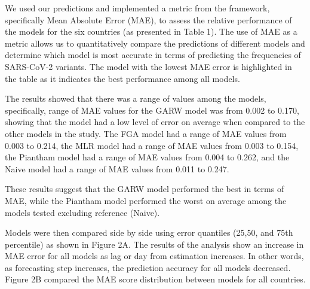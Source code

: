 \documentclass[11pt,oneside,letterpaper]{article}
\begin{document}
We used our predictions and implemented a metric from the framework, specifically Mean Absolute Error (MAE), to assess the relative performance of the models for the six countries (as presented in Table 1). %
The use of MAE as a metric allows us to quantitatively compare the predictions of different models and determine which model is most accurate in terms of predicting the frequencies of SARS-CoV-2 variants.
The model with the lowest MAE error is highlighted in the table as it indicates the best performance among all models. 

The results showed that there was a range of values among the models, specifically, range of MAE values for the GARW model was from 0.002 to 0.170, showing that the model had a low level of error on average when compared to the other models in the study. 
The FGA model had a range of MAE values from 0.003 to 0.214, the MLR model had a range of MAE values from 0.003 to 0.154, the Piantham model had a range of MAE values from 0.004 to 0.262, and the Naive model had a range of MAE values from 0.011 to 0.247. 

These results suggest that the GARW model performed the best in terms of MAE, while the Piantham model performed the worst on average among the models tested excluding reference (Naive).

Models were then compared side by side using error quantiles (25,50, and 75th percentile) as shown in Figure 2A.
The results of the analysis show an increase in MAE error for all models as lag or day from estimation increases. 
In other words, as forecasting step increases, the prediction accuracy for all models decreased.
Figure 2B compared the MAE score distribution between models for all countries.
\end{document}
